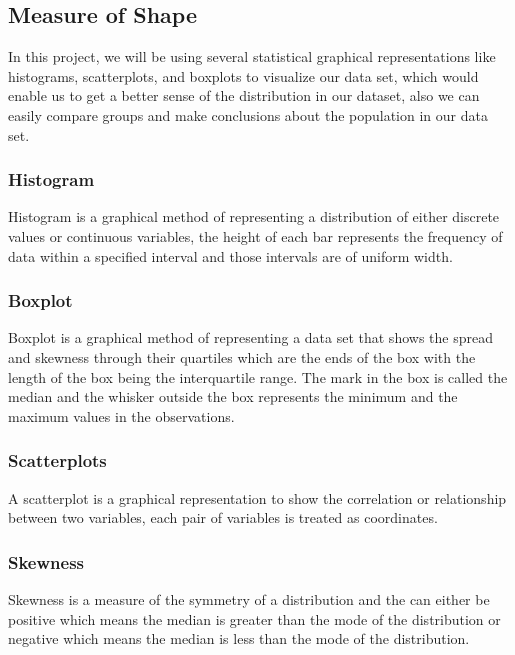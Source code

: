 \documentclass[12 pt]{scrartcl}
\begin{document}
\subsection{Measure of Shape}

In this project, we will be using several statistical graphical representations like histograms, scatterplots, and boxplots to visualize our data set, which would enable us to get a better sense of the distribution in our dataset, also we can easily compare groups and make conclusions about the population in our data set.

\subsubsection{Histogram}


Histogram is a graphical method of representing a distribution of either discrete values or continuous variables, the height of each bar represents the frequency of data within a specified interval and those intervals are of uniform width.

\subsubsection{Boxplot}

Boxplot is a graphical method of representing a data set that shows the spread and skewness through their quartiles which are the ends of the box with the length of the box being the interquartile range. The mark in the box is called the median and the whisker outside the box represents the minimum and the maximum values in the observations.

\subsubsection{Scatterplots}

A scatterplot is a graphical representation to show the correlation or relationship between two variables, each pair of variables is treated as coordinates.

\subsubsection{Skewness}

Skewness is a measure of the symmetry of a distribution and the can either be positive which means the median is greater than the mode of the distribution or negative which means the median is less than the mode of the distribution.
\end{document}
